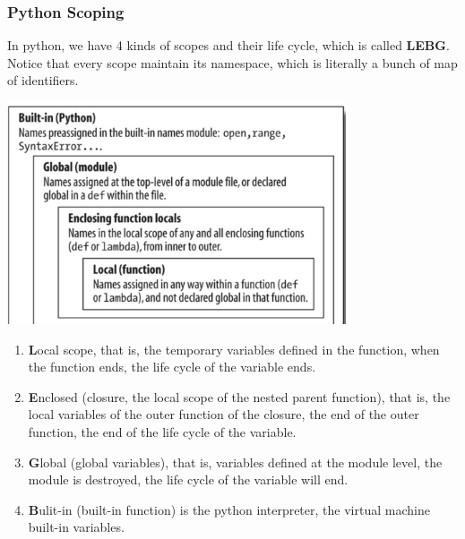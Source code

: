 \documentclass[a4paper]{article}
\theoremstyle{definition}
\begin{document}
\subsubsection{Python Scoping}

In python, we have 4 kinds of scopes and their life cycle, which is called \textbf{LEBG}. Notice that every scope maintain its namespace, which is literally a bunch of map of identifiers.

\includegraphics[width=10cm]{img/Snipaste_2021-04-24_02-41-32.png}
\begin{enumerate}
  \item \textbf{L}ocal scope,  that is, the temporary variables defined in the function, when the function ends, the life cycle of the variable ends.

  \item \textbf{E}nclosed (closure, the local scope of the nested parent function), that is, the local variables of the outer function of the closure, the end of the outer function, the end of the life cycle of the variable.
  \item \textbf{G}lobal (global variables), that is, variables defined at the module level, the module is destroyed, the life cycle of the variable will end.
  \item \textbf{B}ulit-in (built-in function) is the python interpreter, the virtual machine built-in variables.
\end{enumerate}
\end{document}
